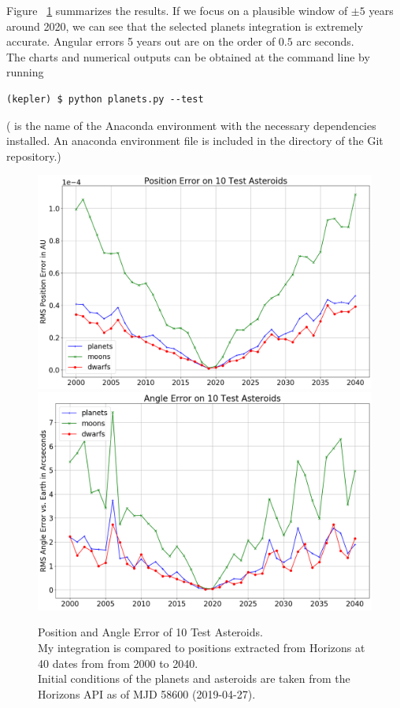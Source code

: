Figure ~\ref{fig:AsteroidIntegrationErrorHorizons} summarizes the results.
If we focus on a plausible window of $\pm 5$ years around 2020, we can see that the selected planets integration is extremely accurate.
Angular errors 5 years out are on the order of $0.5$ arc seconds.\\
The charts and numerical outputs can be obtained at the command line by running
\begin{lstlisting}[style=CodeSnippet]
(kepler) $ python planets.py --test
\end{lstlisting}
( is the name of the Anaconda environment with the necessary dependencies installed.
An anaconda environment file  is included in the  directory of the Git repository.)
\begin{figure}[hbt!]
\begin{center}
\includegraphics[width=1.0\textwidth]{../figs/integration_test/planets/sim_pos_error_comp.png}
\includegraphics[width=1.0\textwidth]{../figs/integration_test/planets/sim_ang_error_comp.png}
\end{center}
\caption[Position and Angle Error of 10 Test Asteroids Initialized from Horizons]
{Position and Angle Error of 10 Test Asteroids. \\
My integration is compared to positions extracted from Horizons at 40 dates from from 2000 to 2040.\\
Initial conditions of the planets and asteroids are taken from the Horizons API as of MJD 58600 (2019-04-27).}
\label{fig:AsteroidIntegrationErrorHorizons}
\end{figure}


